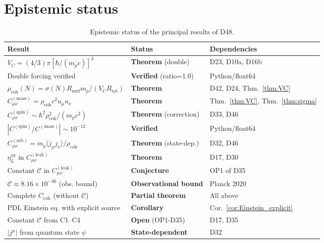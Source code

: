 \documentclass[12pt,a4paper]{article}
\newcommand{\hb}{\hbar}
\newcommand{\Ccoh}{C_{\mathrm{coh}}}
\newcommand{\Cmass}{C^{(\mathrm{mass})}}
\newcommand{\Cspin}{C^{(\mathrm{spin})}}
\newcommand{\Corb}{C^{(\mathrm{orb})}}
\newcommand{\Cleak}{C^{(\mathrm{leak})}}
\newcommand{\rhocoh}{\rho_{\mathrm{coh}}}
\newcommand{\sig}{\sigma}
\newcommand{\Rsurf}{R_{\mathrm{surf}}}
\newcommand{\Rtot}{R_{\mathrm{tot}}}
\newcommand{\VC}{V_C}
\newcommand{\etaL}{\eta_L}
\begin{document}
\section{Epistemic status}
\label{sec:epistemic}

\begin{table}[H]
\centering
\caption{Epistemic status of the principal results of D48.}
\label{tab:epistemic}
\small
\begin{tabular}{p{6.2cm}p{3.8cm}p{3.5cm}}
\toprule
Result & Status & Dependencies \\
\midrule
$\VC = (4/3)\pi[\hb/(m_p c)]^3$ & \textbf{Theorem} (double) & D23, D10a, D16b \\
Double forcing verified & \textbf{Verified} (ratio=1.0) & Python/float64 \\
$\rhocoh(N) = \sig(N)\Rsurf m_p/(\VC\Rtot)$ & \textbf{Theorem} & D42, D24, Thm.~\ref{thm:VC} \\
$\Cmass_{\mu\nu} = \rhocoh c^2 u_\mu u_\nu$ & \textbf{Theorem} & Thm.~\ref{thm:VC}, Thm.~\ref{thm:sigma} \\
$\Cspin_{\mu\nu} \sim \hb^2\rhocoh^2/(m_p c^2)$ & \textbf{Theorem} (correction) & D33, D46 \\
$|\Cspin/\Cmass| \sim 10^{-12}$ & \textbf{Verified} & Python/float64 \\
$\Corb_{\mu\nu} = m_p\langle j_\mu j_\nu\rangle/\rhocoh$ & \textbf{Theorem} (state-dep.) & D32, D46 \\
$\etaL^{18}$ in $\Cleak_{\mu\nu}$ & \textbf{Theorem} & D17, D30 \\
Constant $\mathcal{C}$ in $\Cleak_{\mu\nu}$ & \textbf{Conjecture} & OP1 of D35 \\
$\mathcal{C} \approx 8.16\times10^{-46}$ (obs. bound) & \textbf{Observational bound} & Planck 2020 \\
Complete $\Ccoh$ (without $\mathcal{C}$) & \textbf{Partial theorem} & All above \\
PDL Einstein eq. with explicit source & \textbf{Corollary} & Cor.~\ref{cor:Einstein_explicit} \\
\midrule
Constant $\mathcal{C}$ from C1--C4 & \textbf{Open} (OP1-D35) & D17, D35 \\
$|j^\mu|$ from quantum state $\psi$ & \textbf{State-dependent} & D32 \\
\bottomrule
\end{tabular}
\end{table}
\end{document}

